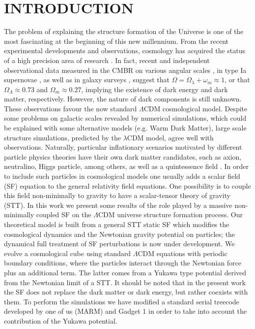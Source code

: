 \documentclass[10pt,journal]{IEEEtran}
\begin{document}
\section{INTRODUCTION}
The problem of explaining the structure formation of
the Universe is one of the most fascinating at the beginning of this new millennium. From the recent experimental developments and observations, cosmology has
acquired the status of a high precision area of research
\cite{1}. In fact, recent and independent observational data
measured in the CMBR on various angular scales \cite{2,3}, in
type Ia supernovae \cite{4}, as well as in galaxy surveys \cite{5,6},
suggest that $\Omega=\Omega_\lambda + \omega_m \approx 1$, or that $\Omega_\Lambda \approx 0.73 $ and
$\Omega_m \approx 0.27 $, implying the existence of dark energy and
dark matter, respectively. However, the nature of dark
components is still unknown. These observations favour
the now standard $\Lambda$CDM cosmological model. Despite
some problems on galactic scales revealed by numerical
simulations, which could be explained with some alternative models (e.g. Warm Dark Matter), large scale structure simulations, predicted by the $\lambda$CDM model, agree
well with observations. Naturally, particular inflationary
scenarios motivated by different particle physics theories
have their own dark matter candidates, such as axion,
neutralino, Higgs particle, among others, as well as a
quintessence field \cite{7,8}. In order to include such particles in cosmological models one usually adds a scalar field
(SF) equation to the general relativity field equations.
One possibility is to couple this field non-minimally to
gravity to have a scalar-tensor theory of gravity (STT). \newline
In this work we present some results of the role played
by a massive non-minimally coupled SF on the $\Lambda$CDM
universe structure formation process. Our theoretical
model is built from a general STT static SF which modifies the cosmological dynamics and the Newtonian gravity potential on particles; the dynamical full treatment of
SF perturbations is now under development. We evolve a
cosmological cube using standard $\Lambda$CDM equations with
periodic boundary conditions, where the particles interact through the Newtonian force plus an additional term.
The latter comes from a Yukawa type potential derived
from the Newtonian limit of a STT. It should be noted
that in the present work the SF does not replace the dark
matter or dark energy, but rather coexists with them. To
perform the simulations we have modified a standard serial treecode developed by one of us (MARM) \cite{9} and
Gadget 1 \cite{10} in order to take into account the contribution of the Yukawa potential.
\end{document}
